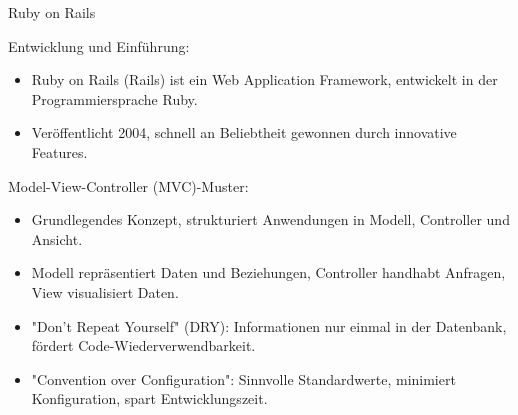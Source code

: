 \documentclass{beamer}
\begin{document}
\begin{frame}{Ruby on Rails}

Entwicklung und Einführung:
  \begin{itemize}
    \item Ruby on Rails (Rails) ist ein Web Application Framework, entwickelt in der Programmiersprache Ruby.
    \item Veröffentlicht 2004, schnell an Beliebtheit gewonnen durch innovative Features.
  \end{itemize}


Model-View-Controller (MVC)-Muster:

  \begin{itemize}
    \item Grundlegendes Konzept, strukturiert Anwendungen in Modell, Controller und Ansicht.
    \item Modell repräsentiert Daten und Beziehungen, Controller handhabt Anfragen, View visualisiert Daten.
  \end{itemize}

  \begin{itemize}
    \item "Don't Repeat Yourself" (DRY): Informationen nur einmal in der Datenbank, fördert Code-Wiederverwendbarkeit.
    \item "Convention over Configuration": Sinnvolle Standardwerte, minimiert Konfiguration, spart Entwicklungszeit.
  \end{itemize}
\end{frame}
\end{document}
